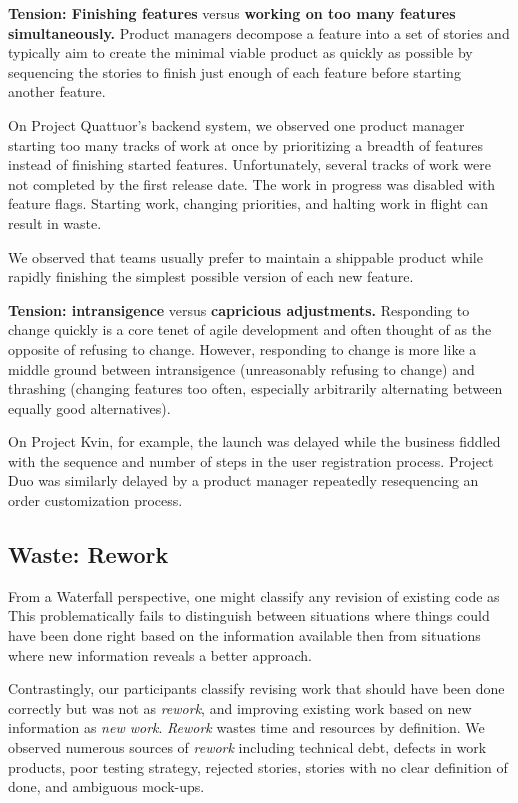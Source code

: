 \textbf{Tension: Finishing features} versus \textbf{working on too many features simultaneously.}
Product managers decompose a feature into a set of stories and typically aim to create the minimal viable product as quickly as possible by sequencing the stories to finish just enough of each feature before starting another feature. 

On Project Quattuor's backend system, we observed one product manager starting too many tracks of work at once by prioritizing a breadth of features instead of finishing started features. Unfortunately, several tracks of work were not completed by the first release date. The work in progress was disabled with feature flags. Starting work, changing priorities, and halting work in flight can result in waste.

We observed that teams usually prefer to maintain a shippable product while rapidly finishing the simplest possible version of each new feature.

\textbf{Tension: intransigence} versus \textbf{capricious adjustments.}
Responding to change quickly is a core tenet of agile development and often thought of as the opposite of refusing to change. However, responding to change is more like a middle ground between intransigence (unreasonably refusing to change) and thrashing (changing features too often, especially arbitrarily alternating between equally good alternatives). 

On Project Kvin, for example, the launch was delayed while the business fiddled with the sequence and number of steps in the user registration process. Project Duo was similarly delayed by a product manager repeatedly resequencing an order customization process. 
\subsection{Waste: Rework}
From a Waterfall perspective, one might classify any revision of existing code as  This problematically fails to distinguish between situations where things could have been done right based on the information available then from situations where new information reveals a better approach. 

Contrastingly, our participants classify revising work that should have been done correctly but was not as \textit{rework}, and improving existing work based on new information as \textit{new work}. \textit{Rework} wastes time and resources by definition. We observed numerous sources of \textit{rework} including technical debt, defects in work products, poor testing strategy, rejected stories, stories with no clear definition of done, and ambiguous mock-ups.
 
